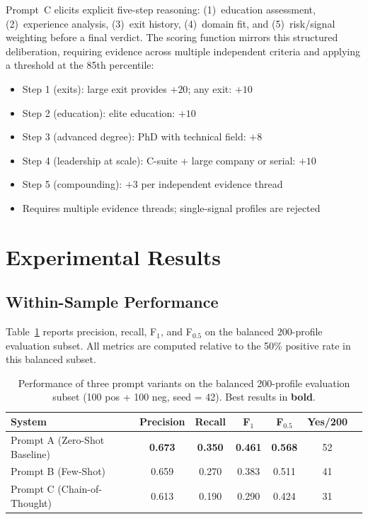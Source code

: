 \documentclass{article}
\begin{document}
Prompt~C elicits explicit five-step reasoning: (1)~education assessment, (2)~experience analysis, (3)~exit history, (4)~domain fit, and (5)~risk/signal weighting before a final verdict. The scoring function mirrors this structured deliberation, requiring evidence across multiple independent criteria and applying a threshold at the 85th percentile:
\begin{itemize}
  \item Step 1 (exits): large exit provides $+20$; any exit: $+10$
  \item Step 2 (education): elite education: $+10$
  \item Step 3 (advanced degree): PhD with technical field: $+8$
  \item Step 4 (leadership at scale): C-suite + large company or serial: $+10$
  \item Step 5 (compounding): $+3$ per independent evidence thread
  \item Requires multiple evidence threads; single-signal profiles are rejected
\end{itemize}

\section{Experimental Results}

\subsection{Within-Sample Performance}

Table~\ref{tab:main_results} reports precision, recall, F$_1$, and F$_{0.5}$ on the balanced 200-profile evaluation subset. All metrics are computed relative to the 50\% positive rate in this balanced subset.

\begin{table}[h]
\centering
\caption{Performance of three prompt variants on the balanced 200-profile evaluation subset (100 pos + 100 neg, seed = 42). Best results in \textbf{bold}.}
\label{tab:main_results}
\begin{tabular}{lcccccc}
\toprule
\textbf{System} & \textbf{Precision} & \textbf{Recall} & \textbf{F$_1$} & \textbf{F$_{0.5}$} & \textbf{Yes/200} \\
\midrule
\rowcolor{bestrow}
Prompt A (Zero-Shot Baseline)    & \textbf{0.673} & \textbf{0.350} & \textbf{0.461} & \textbf{0.568} & 52 \\
Prompt B (Few-Shot)              & 0.659          & 0.270          & 0.383          & 0.511          & 41 \\
Prompt C (Chain-of-Thought)      & 0.613          & 0.190          & 0.290          & 0.424          & 31 \\
\bottomrule
\end{tabular}
\end{table}
\end{document}
